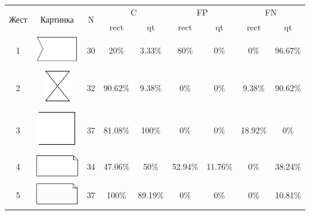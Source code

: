 \documentclass[a5paper]{article}
\begin{document}
\begin{table}[ht]
  \label{experimentsTable}
  \fontsize{6}{8}
  \selectfont
  \begin{tabular} {| c | c | c | c | c | c | c | c | c |}
    \hline
    \multirow{2}{*}{Жест} & \multirow{2}{*}{Картинка} & \multirow{2}{*}{N} & \multicolumn{2}{c}{C} & \multicolumn{2}{|c}{FP} & \multicolumn{2}{|c|}{FN} \\
    \cline{4-9}
                          &                           &                    & rect    & qt          & rect & qt               & rect & qt \\ \hline     
    1&   \includegraphics[scale=0.5]{gesture1.png}    & 30                 & 20\%    & 3.33\%         & 80\% & 0\%              & 0\%  & 96.67\% \\ \hline
    2&   \includegraphics[scale=0.5]{gesture2.png}    & 32                 & 90.62\% & 9.38\%         & 0\% & 0\%              & 9.38\%  & 90.62\% \\ \hline
    3&   \includegraphics[scale=0.5]{gesture3.png}    & 37                 & 81.08\% & 100\%          & 0\% & 0\%              & 18.92\%  & 0\% \\ \hline
    4&   \includegraphics[scale=0.5]{gesture4.png}    & 34                 & 47.06\% & 50\%           & 52.94\% & 11.76\%              & 0\%  & 38.24\% \\ \hline
    5&   \includegraphics[scale=0.5]{gesture5.png}    & 37                 & 100\%   & 89.19\%        & 0\% & 0\%              & 0\%  & 10.81\% \\ \hline

\end{tabular}
\end{table}
\end{document}
